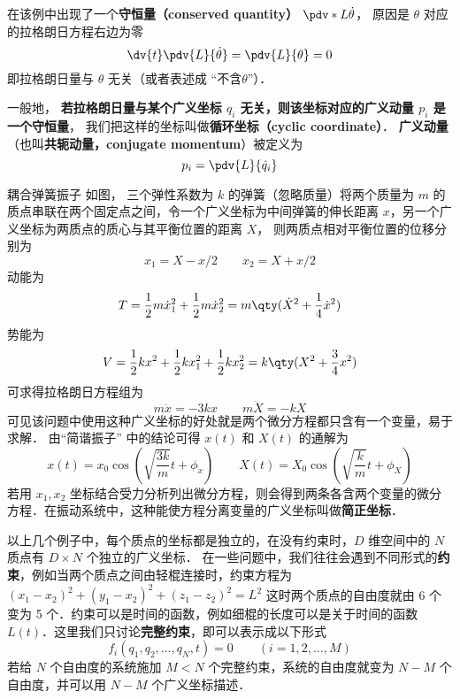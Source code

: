 在该例中出现了一个\textbf{守恒量（conserved quantity）} $\pdv*{L}{\dot\theta}$， 原因是 $\theta$ 对应的拉格朗日方程右边为零
\begin{equation}
\dv{t}\pdv{L}{\dot\theta} = \pdv{L}{\theta} = 0
\end{equation}
即拉格朗日量与 $\theta$ 无关（或者表述成 “不含$\theta$”）．

一般地， \textbf{若拉格朗日量与某个广义坐标 $q_i$ 无关，则该坐标对应的广义动量 $p_i$ 是一个守恒量}， 我们把这样的坐标叫做\textbf{循环坐标（cyclic coordinate）}． \textbf{广义动量}（也叫\textbf{共轭动量，conjugate momentum}）被定义为
\begin{equation}\label{Lagrng_eq13}
p_i = \pdv{L}{\dot q_i}
\end{equation}

\begin{example}{耦合弹簧振子}
如图，%
三个弹性系数为 $k$ 的弹簧（忽略质量）将两个质量为 $m$ 的质点串联在两个固定点之间，令一个广义坐标为中间弹簧的伸长距离 $x$，另一个广义坐标为两质点的质心与其平衡位置的距离 $X$， 则两质点相对平衡位置的位移分别为
\begin{equation}
x_1=X-x/2 \qquad x_2 = X+x/2
\end{equation}
动能为
\begin{equation}
T=\frac12 m\dot x_1^2 + \frac12 m\dot x_2^2 = m \qty(\dot X^2 + \frac14 \dot x^2)
\end{equation}
势能为
\begin{equation}
V = \frac12 k x^2 + \frac12 kx_1^2 + \frac12 k x_2^2 = k\qty(X^2 + \frac34 x^2)
\end{equation}
可求得拉格朗日方程组为
\begin{equation}
m\ddot x =  - 3kx \qquad m\ddot X =  - kX
\end{equation}
可见该问题中使用这种广义坐标的好处就是两个微分方程都只含有一个变量，易于求解． 由“简谐振子” 中的结论可得 $x(t)$ 和 $X(t)$ 的通解为
\begin{equation}
x(t) = x_0 \cos(\sqrt{\frac{3k}{m}} t + \phi_x)
\qquad
X(t) = X_0 \cos(\sqrt{\frac{k}{m}} t + \phi_X)
\end{equation}
若用 $x_1, x_2$ 坐标结合受力分析列出微分方程，则会得到两条各含两个变量的微分方程．在振动系统中，这种能使方程分离变量的广义坐标叫做\textbf{简正坐标}．%
\end{example}

以上几个例子中，每个质点的坐标都是独立的，在没有约束时，$D$ 维空间中的 $N$ 质点有 $D\times N$ 个独立的广义坐标． 在一些问题中，我们往往会遇到不同形式的\textbf{约束}，例如当两个质点之间由轻棍连接时，约束方程为 $(x_1-x_2)^2+(y_1-x_2)^2+(z_1-z_2)^2=L^2$ 这时两个质点的自由度就由 6 个变为 5 个．约束可以是时间的函数，例如细棍的长度可以是关于时间的函数 $L(t)$．这里我们只讨论\textbf{完整约束}，即可以表示成以下形式
\begin{equation}
f_i(q_1,q_2,\dots ,q_N,t) = 0 \qquad (i = 1,2,\dots,M)
\end{equation}
若给 $N$ 个自由度的系统施加 $M<N$ 个完整约束，系统的自由度就变为 $N-M$ 个自由度，并可以用 $N-M$ 个广义坐标描述．

